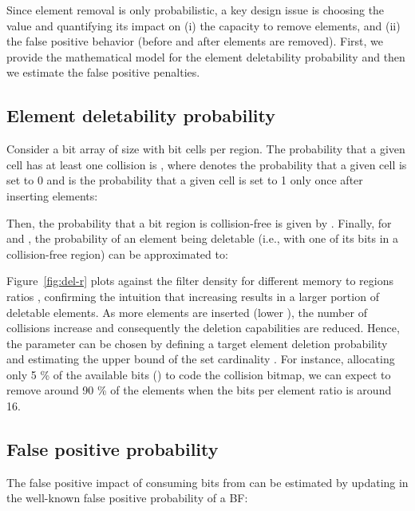 \documentclass[conference]{IEEEtran}
\begin{document}
Since element removal is only probabilistic, a key design issue is choosing the value  and quantifying its impact on (i) the capacity to remove elements, and (ii) the false positive behavior (before and after elements are removed).
First, we provide the mathematical model for the element deletability probability and then we estimate the false positive penalties.




\subsection{Element deletability probability}

Consider a bit array of size  with  bit cells per region.   
The probability that a given cell has at least one collision is , where
 denotes the probability that a given cell is set to 0 and  is the
probability that a given cell is set to 1 only once after inserting  elements: \begin{footnotesize}

\end{footnotesize}
Then, the probability that a  bit region is collision-free is given by . 
Finally, for  and , the probability of an element being deletable (i.e., with one of its  bits in a collision-free region) can be approximated to:\begin{footnotesize}

\end{footnotesize}
Figure~\ref{fig:del-r} plots  against the filter density  for different memory to regions ratios , confirming the intuition that increasing  results in a larger portion of deletable elements. As more elements are inserted (lower ), the number of collisions increase and consequently the deletion capabilities are reduced. 
Hence,  the parameter  can be chosen by defining a target element deletion probability  and estimating the upper bound of the set cardinality . 
For instance, allocating only 5 \% of the available bits () to code the collision bitmap, we can expect to remove around 90 \% of the elements when the bits per element ratio  is around 16. 



\subsection{False positive probability}

The false positive impact of consuming  bits from  can be estimated by updating  in the well-known false positive probability of a BF: 
\end{document}

